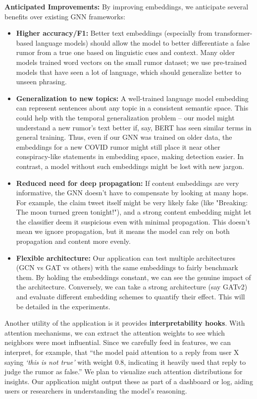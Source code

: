 \documentclass[12pt,a4paper]{report}
\begin{document}
\textbf{Anticipated Improvements:} By improving embeddings, we anticipate several benefits over existing GNN frameworks:
\begin{itemize}[leftmargin=1.2cm]
    \item \textbf{Higher accuracy/F1:} Better text embeddings (especially from transformer-based language models) should allow the model to better differentiate a false rumor from a true one based on linguistic cues and context. Many older models trained word vectors on the small rumor dataset; we use pre-trained models that have seen a lot of language, which should generalize better to unseen phrasing.
    \item \textbf{Generalization to new topics:} A well-trained language model embedding can represent sentences about any topic in a consistent semantic space. This could help with the temporal generalization problem – our model might understand a new rumor’s text better if, say, BERT has seen similar terms in general training. Thus, even if our GNN was trained on older data, the embeddings for a new COVID rumor might still place it near other conspiracy-like statements in embedding space, making detection easier. In contrast, a model without such embeddings might be lost with new jargon.
    \item \textbf{Reduced need for deep propagation:} If content embeddings are very informative, the GNN doesn’t have to compensate by looking at many hops. For example, the claim tweet itself might be very likely fake (like "Breaking: The moon turned green tonight!"), and a strong content embedding might let the classifier deem it suspicious even with minimal propagation. This doesn’t mean we ignore propagation, but it means the model can rely on both propagation and content more evenly.
    \item \textbf{Flexible architecture:} Our application can test multiple architectures (GCN vs GAT vs others) with the same embeddings to fairly benchmark them. By holding the embeddings constant, we can see the genuine impact of the architecture. Conversely, we can take a strong architecture (say GATv2) and evaluate different embedding schemes to quantify their effect. This will be detailed in the experiments.
\end{itemize}

Another utility of the application is it provides \textbf{interpretability hooks}. With attention mechanisms, we can extract the attention weights to see which neighbors were most influential. Since we carefully feed in features, we can interpret, for example, that “the model paid attention to a reply from user X saying \textit{‘this is not true’} with weight 0.8, indicating it heavily used that reply to judge the rumor as false.” We plan to visualize such attention distributions for insights. Our application might output these as part of a dashboard or log, aiding users or researchers in understanding the model’s reasoning.
\end{document}
